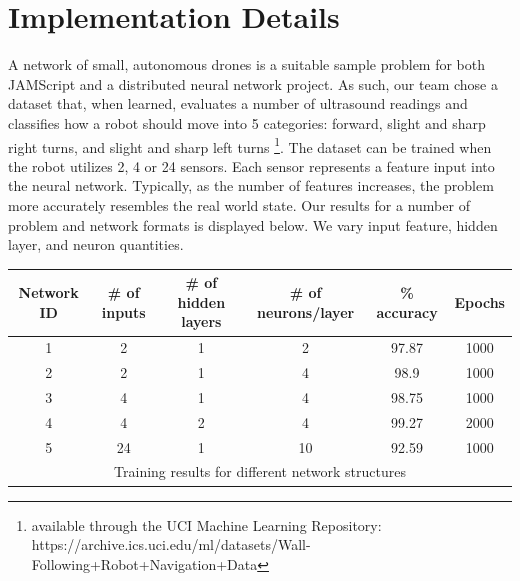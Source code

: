 \documentclass{article}
\begin{document}
\section{Implementation Details}
\begin{multicols}{2}
A network of small, autonomous drones is a suitable sample problem for both JAMScript and a distributed neural network project. As such, our team chose a dataset that, when learned, evaluates a number of ultrasound readings and classifies how a robot should move into 5 categories: forward, slight and sharp right turns, and slight and sharp left turns \footnote{available through the UCI Machine Learning Repository: https://archive.ics.uci.edu/ml/datasets/Wall-Following+Robot+Navigation+Data}. The dataset can be trained when the robot utilizes 2, 4 or 24 sensors. Each sensor represents a feature input into the neural network. Typically, as the number of features increases, the problem more accurately resembles the real world state. Our results for a number of problem and network formats is displayed below. We vary input feature, hidden layer, and neuron quantities.
\end{multicols}
	\begin{center}
	\begin{tabular}{ |c|c c c c c| } 
	\hline
	Network ID & \# of inputs & \# of hidden layers & \# of neurons/layer & \% accuracy & Epochs \\ 
	\hline
	1 & 2 & 1 & 2 & 97.87 & 1000 \\ 
	2 & 2 & 1 & 4 & 98.9 & 1000\\ 
	3 & 4 & 1 & 4 & 98.75 & 1000\\ 
	4 & 4 & 2 & 4 & 99.27 & 2000\\
	5 & 24 & 1 & 10 & 92.59 & 1000\\  
	\hline
	\multicolumn{6}{c}{\small Training results for different network structures}
	\end{tabular}
	\end{center}
\end{document}
